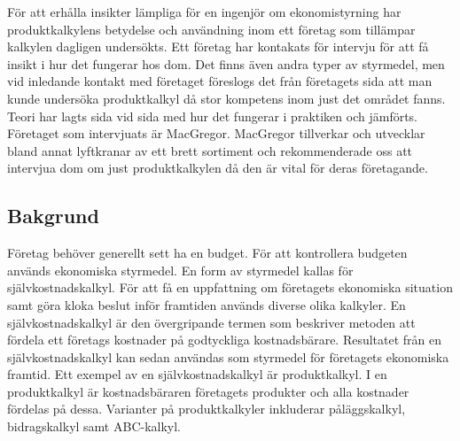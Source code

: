 För att erhålla insikter lämpliga för en ingenjör om ekonomistyrning har produktkalkylens betydelse och användning inom ett företag som tillämpar kalkylen dagligen undersökts.
Ett företag har kontakats för intervju för att få insikt i hur det fungerar hos dom.
Det finns även andra typer av styrmedel, men vid inledande kontakt med företaget föreslogs det från företagets sida att man kunde undersöka produktkalkyl då stor kompetens inom just det området fanns.
Teori har lagts sida vid sida med hur det fungerar i praktiken och jämförts.
Företaget som intervjuats är MacGregor.
MacGregor tillverkar och utvecklar bland annat lyftkranar av ett brett sortiment och rekommenderade oss att intervjua dom om just produktkalkylen då den är vital för deras företagande.


%
%


%
%

\subsection{Bakgrund} 
Företag behöver generellt sett ha en budget.
För att kontrollera budgeten används ekonomiska styrmedel.
En form av styrmedel kallas för självkostnadskalkyl.
För att få en uppfattning om företagets ekonomiska situation samt göra kloka beslut inför framtiden används diverse olika kalkyler.
En självkostnadskalkyl är den övergripande termen som beskriver metoden att fördela ett företags kostnader på godtyckliga kostnadsbärare.
Resultatet från en självkostnadskalkyl kan sedan användas som styrmedel för företagets ekonomiska framtid.
Ett exempel av en självkostnadskalkyl är produktkalkyl.
I en produktkalkyl är kostnadsbäraren företagets produkter och alla kostnader fördelas på dessa.
Varianter på produktkalkyler inkluderar påläggskalkyl, bidragskalkyl samt ABC-kalkyl. \cite{dne}

